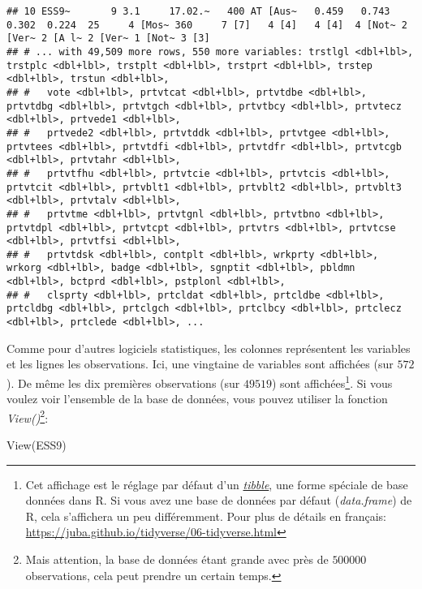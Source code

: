 \documentclass[
]{book}
\newenvironment{Shaded}{\begin{snugshade}}{\end{snugshade}}
\newcommand{\FunctionTok}[1]{\textcolor[rgb]{0.00,0.00,0.00}{#1}}
\newcommand{\NormalTok}[1]{#1}
\begin{document}
\begin{verbatim}
## 10 ESS9~       9 3.1     17.02.~   400 AT [Aus~   0.459   0.743   0.302  0.224  25     4 [Mos~ 360     7 [7]   4 [4]   4 [4]  4 [Not~ 2 [Ver~ 2 [A l~ 2 [Ver~ 1 [Not~ 3 [3]  
## # ... with 49,509 more rows, 550 more variables: trstlgl <dbl+lbl>, trstplc <dbl+lbl>, trstplt <dbl+lbl>, trstprt <dbl+lbl>, trstep <dbl+lbl>, trstun <dbl+lbl>,
## #   vote <dbl+lbl>, prtvtcat <dbl+lbl>, prtvtdbe <dbl+lbl>, prtvtdbg <dbl+lbl>, prtvtgch <dbl+lbl>, prtvtbcy <dbl+lbl>, prtvtecz <dbl+lbl>, prtvede1 <dbl+lbl>,
## #   prtvede2 <dbl+lbl>, prtvtddk <dbl+lbl>, prtvtgee <dbl+lbl>, prtvtees <dbl+lbl>, prtvtdfi <dbl+lbl>, prtvtdfr <dbl+lbl>, prtvtcgb <dbl+lbl>, prtvtahr <dbl+lbl>,
## #   prtvtfhu <dbl+lbl>, prtvtcie <dbl+lbl>, prtvtcis <dbl+lbl>, prtvtcit <dbl+lbl>, prtvblt1 <dbl+lbl>, prtvblt2 <dbl+lbl>, prtvblt3 <dbl+lbl>, prtvtalv <dbl+lbl>,
## #   prtvtme <dbl+lbl>, prtvtgnl <dbl+lbl>, prtvtbno <dbl+lbl>, prtvtdpl <dbl+lbl>, prtvtcpt <dbl+lbl>, prtvtrs <dbl+lbl>, prtvtcse <dbl+lbl>, prtvtfsi <dbl+lbl>,
## #   prtvtdsk <dbl+lbl>, contplt <dbl+lbl>, wrkprty <dbl+lbl>, wrkorg <dbl+lbl>, badge <dbl+lbl>, sgnptit <dbl+lbl>, pbldmn <dbl+lbl>, bctprd <dbl+lbl>, pstplonl <dbl+lbl>,
## #   clsprty <dbl+lbl>, prtcldat <dbl+lbl>, prtcldbe <dbl+lbl>, prtcldbg <dbl+lbl>, prtclgch <dbl+lbl>, prtclbcy <dbl+lbl>, prtclecz <dbl+lbl>, prtclede <dbl+lbl>, ...
\end{verbatim}

Comme pour d'autres logiciels statistiques, les colonnes représentent les variables et les lignes les observations. Ici, une vingtaine de variables sont affichées (sur \(572\)). De même les dix premières observations (sur \(49519\)) sont affichées\footnote{Cet affichage est le réglage par défaut d'un \href{https://tibble.tidyverse.org/}{\emph{tibble}}, une forme spéciale de base données dans R. Si vous avez une base de données par défaut (\emph{data.frame}) de R, cela s'affichera un peu différemment. Pour plus de détails en français: \url{https://juba.github.io/tidyverse/06-tidyverse.html}}. Si vous voulez voir l'ensemble de la base de données, vous pouvez utiliser la fonction \emph{View()}\footnote{Mais attention, la base de données étant grande avec près de \(500000\) observations, cela peut prendre un certain temps.}:

\begin{Shaded}
\begin{Highlighting}[]
\FunctionTok{View}\NormalTok{(ESS9)}
\end{Highlighting}
\end{Shaded}
\end{document}
